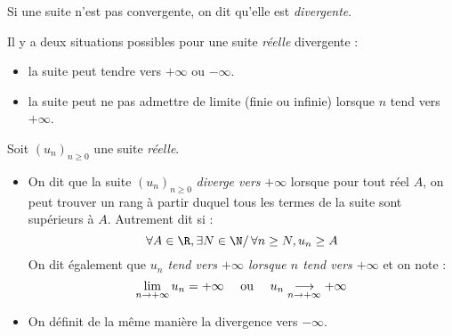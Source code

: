 \documentclass[french,11pt,twoside]{VcCours}
\begin{document}
\begin{Demonstration}{}

\vspace{10cm}
%
%
%

\end{Demonstration}

\begin{Definition}{}
	Si une suite n'est pas convergente, on dit qu'elle est \emph{divergente}.
\end{Definition}

Il y a deux situations possibles pour une suite \emph{réelle} divergente :
\begin{itemize}
 \item la suite peut tendre vers $+\infty$ ou $-\infty$.
 \item la suite peut ne pas admettre de limite (finie ou infinie) lorsque $n$ tend vers $+\infty$.
\end{itemize}


\begin{Definition}{}
Soit $(u_n)_{n \geq 0}$ une suite \emph{réelle}.
\begin{itemize}
\item On dit que la suite $(u_n)_{n \geq 0}$ \emph{diverge vers} $+\infty$ lorsque pour tout réel $A$, on peut trouver un rang à partir duquel tous les termes de la suite sont supérieurs à $A$. Autrement dit si :
$$\forall A \in \R, \exists N \in \N / \, \forall n \ge N, u_n \geq A $$
On dit également que \emph{$u_n$ tend vers $+\infty$ lorsque $n$ tend vers $+\infty$} et on note :
$$\displaystyle{\lim_{n \rightarrow +\infty}u_n=+\infty} \quad \hbox{ ou } \quad u_n \underset{n \rightarrow + \infty}{\longrightarrow} + \infty $$
\item On définit de la même manière la divergence vers $- \infty$.
\end{itemize}
\end{Definition}
\end{document}

